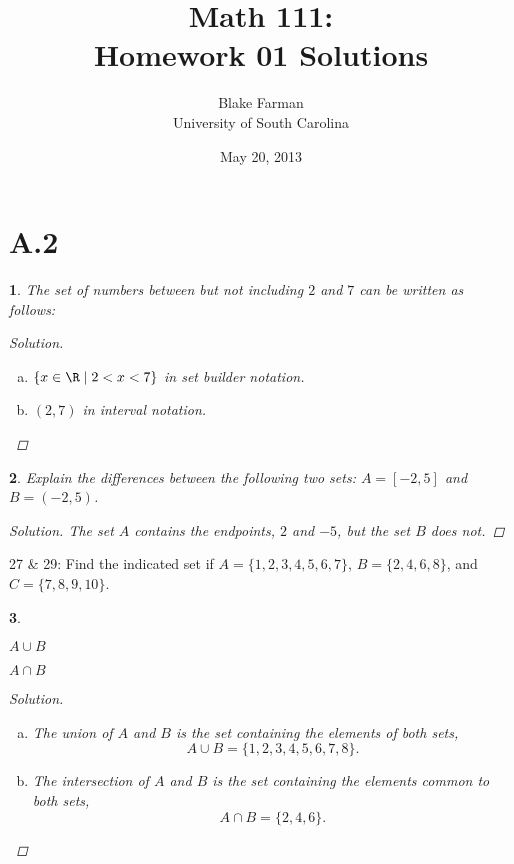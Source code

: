 \documentclass[12pt]{amsart}
\author{Blake Farman\\University of South Carolina}
\title{Math 111:\\Homework 01 Solutions}
\date{May 20, 2013}
\newtheorem{thm}{}
\begin{document}
\maketitle

\section*{A.2}

\setcounter{thm}{2}
\begin{thm}
  The set of numbers between but not including $2$ and $7$ can be written as follows:
  
  \begin{proof}[Solution]
    \begin{enumerate}[(a)]
    \item
      $\left\{x \in \R \;\middle\vert\; 2 < x < 7 \right\}$ in set builder notation.
    \item
      $(2, 7)$ in interval notation.
    \end{enumerate}    
  \end{proof}
\end{thm}

\begin{thm}
  Explain the differences between the following two sets: $A = [-2, 5]$ and $B = (-2, 5)$.
  
  \begin{proof}[Solution]
    The set $A$ contains the endpoints, $2$ and $-5$, but the set $B$ does not.
  \end{proof}
\end{thm}

27 \& 29: Find the indicated set if $A = \{1,2,3,4,5,6,7\}$, $B = \{2,4,6,8\}$, and $C = \{7,8,9,10\}$.

\setcounter{thm}{26}
\begin{thm}
  \begin{inparaenum}[(a)]
  \item
    $A \cup B$
    \hspace{50mm}
  \item
    $A \cap B$
  \end{inparaenum}
  
  \begin{proof}[Solution]
    \begin{enumerate}[(a)]
    \item
      The union of $A$ and $B$ is the set containing the elements of both sets,
      $$A \cup B = \{1, 2, 3, 4, 5, 6, 7, 8\}.$$
    \item
      The intersection of $A$ and $B$ is the set containing the elements common to both sets,
      $$A \cap B = \{2, 4, 6\}.$$
    \end{enumerate}
  \end{proof}
\end{thm}
\end{document}
